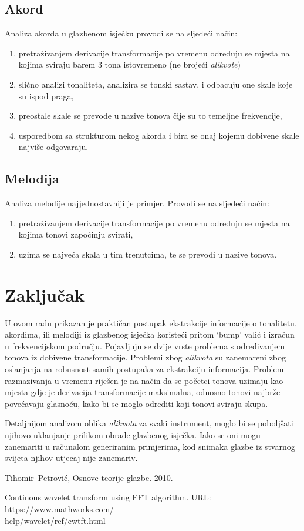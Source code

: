 \documentclass[a4paper, 10pt, twocolumn]{article}
\begin{document}
\subsection{Akord}
Analiza akorda u glazbenom isječku provodi se na sljedeći način:
\begin{enumerate}
  \item pretraživanjem derivacije transformacije po vremenu određuju se mjesta na kojima sviraju barem 3 tona istovremeno (ne brojeći \textit{alikvote})
  \item slično analizi tonaliteta, analizira se tonski sastav, i odbacuju one skale koje su ispod praga,
  \item preostale skale se prevode u nazive tonova čije su to temeljne frekvencije,
  \item usporedbom sa strukturom nekog akorda i bira se onaj kojemu dobivene skale najviše odgovaraju.
\end{enumerate}

\subsection{Melodija}
Analiza melodije najjednostavniji je primjer. Provodi se na sljedeći način:
\begin{enumerate}
  \item pretraživanjem derivacije transformacije po vremenu određuju se mjesta na kojima tonovi započinju svirati,
  \item uzima se najveća skala u tim trenutcima, te se prevodi u nazive tonova.
\end{enumerate}

\section{Zaključak}
U ovom radu prikazan je praktičan postupak ekstrakcije informacije o tonalitetu, akordima, ili melodiji iz glazbenog isječka koristeći pritom `bump' valić i izračun u frekvencijskom području.
Pojavljuju se dvije vrste problema s određivanjem tonova iz dobivene transformacije.
Problemi zbog \textit{alikvota} su zanemareni zbog oslanjanja na robusnost samih postupaka za ekstrakciju informacija.
Problem razmazivanja u vremenu riješen je na način da se početci tonova uzimaju kao mjesta gdje je derivacija transformacije maksimalna, odnosno tonovi najbrže povećavaju glasnoću, kako bi se moglo odrediti koji tonovi sviraju skupa.

Detaljnijom analizom oblika \textit{alikvota} za svaki instrument, moglo bi se poboljšati njihovo uklanjanje prilikom obrade glazbenog isječka.
Iako se oni mogu zanemariti u računalom generiranim primjerima, kod snimaka glazbe iz stvarnog svijeta njihov utjecaj nije zanemariv.

\begin{thebibliography}{25}
Tihomir~Petrović,
Osnove teorije glazbe.
2010.

Continous wavelet transform using FFT algorithm.
URL: https://www.mathworks.com/\\help/wavelet/ref/cwtft.html

\end{thebibliography} 
\end{document}
